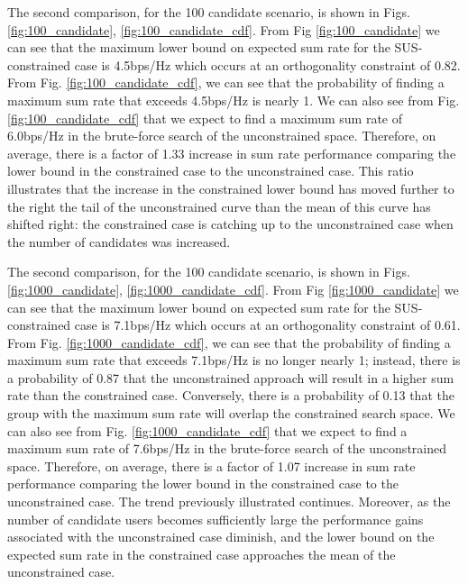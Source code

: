 The second comparison, for the 100 candidate scenario, is shown in Figs. \ref{fig:100_candidate}, \ref{fig:100_candidate_cdf}. From Fig \ref{fig:100_candidate} we can see that the maximum lower bound on expected sum rate for the SUS-constrained case is 4.5bps/Hz which occurs at an orthogonality constraint of 0.82. From Fig. \ref{fig:100_candidate_cdf}, we can see that the probability of finding a maximum sum rate that exceeds 4.5bps/Hz is nearly 1. We can also see from Fig. \ref{fig:100_candidate_cdf} that we expect to find a maximum sum rate of 6.0bps/Hz in the brute-force search of the unconstrained space. Therefore, on average, there is a factor of 1.33 increase in sum rate performance comparing the lower bound in the constrained case to the unconstrained case. This ratio illustrates that the increase in the constrained lower bound has moved further to the right the tail of the unconstrained curve than the mean of this curve has shifted right: the constrained case is catching up to the unconstrained case when the number of candidates was increased.

The second comparison, for the 100 candidate scenario, is shown in Figs. \ref{fig:1000_candidate}, \ref{fig:1000_candidate_cdf}. From Fig \ref{fig:1000_candidate} we can see that the maximum lower bound on expected sum rate for the SUS-constrained case is 7.1bps/Hz which occurs at an orthogonality constraint of 0.61. From Fig. \ref{fig:1000_candidate_cdf}, we can see that the probability of finding a maximum sum rate that exceeds 7.1bps/Hz is no longer nearly 1; instead, there is a probability of 0.87 that the unconstrained approach will result in a higher sum rate than the constrained case. Conversely, there is a probability of 0.13 that the group with the maximum sum rate will overlap the constrained search space. We can also see from Fig. \ref{fig:1000_candidate_cdf} that we expect to find a maximum sum rate of 7.6bps/Hz in the brute-force search of the unconstrained space. Therefore, on average, there is a factor of 1.07 increase in sum rate performance comparing the lower bound in the constrained case to the unconstrained case. The trend previously illustrated continues. Moreover, as the number of candidate users becomes sufficiently large the performance gains associated with the unconstrained case diminish, and the lower bound on the expected sum rate in the constrained case approaches the mean of the unconstrained case.


